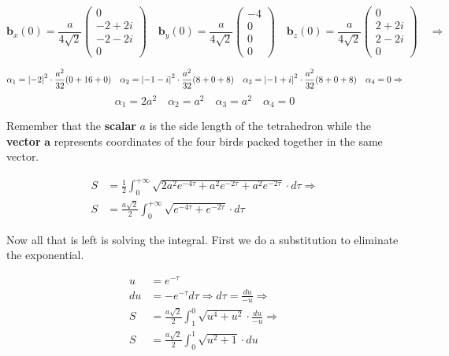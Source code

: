 \documentclass{article}
\newcommand{\vect}[1]{\mathbf{#1}}
\begin{document}
\[\vect b_x(0) = \frac{a}{4\sqrt{2}}\begin{pmatrix}
    0\\
    -2+2i\\
    -2-2i\\
    0
\end{pmatrix}\quad
\vect b_y(0) = \frac{a}{4\sqrt{2}}\begin{pmatrix}
    -4\\
    0\\
    0\\
    0
\end{pmatrix}\quad
\vect b_z(0) = \frac{a}{4\sqrt{2}}\begin{pmatrix}
    0\\
    2+2i\\
    2-2i\\
    0
\end{pmatrix} \quad \Rightarrow\]

\[\alpha_1 = \abs{-2}^2\cdot\frac{a^2}{32}(0+16+0) \quad \alpha_2 = \abs{-1-i}^2\cdot\frac{a^2}{32}(8+0+8) \quad \alpha_3 = \abs{-1+i}^2\cdot\frac{a^2}{32}(8+0+8) \quad \alpha_4 = 0 \Rightarrow\]
\[\boxed{\alpha_1 = 2a^2 \quad \alpha_2 = a^2 \quad \alpha_3 = a^2 \quad \alpha_4 = 0}\]

Remember that the \textbf{scalar} $a$ is the side length of the tetrahedron while the \textbf{vector} $\vect{a}$ represents coordinates of the four birds packed together in the same vector.

\begin{align*}
S &= \frac{1}{2}\int_0^{+\infty}\sqrt{2a^2 e^{-4\tau} + a^2 e^{-2\tau} + a^2 e^{-2\tau}}\cdot d\tau \Rightarrow \\
S &= \frac{a\sqrt{2}}{2}\int_0^{+\infty}\sqrt{e^{-4\tau} + e^{-2\tau}}\cdot d\tau
\end{align*}

Now all that is left is solving the integral. First we do a substitution to eliminate the exponential.

\begin{align*}
u &= e^{-\tau} \\
du &= -e^{-\tau}d\tau \Rightarrow d\tau = \frac{du}{-u} \Rightarrow \\
S &= \frac{a\sqrt{2}}{2}\int_1^{0}\sqrt{u^4 + u^2}\cdot \frac{du}{-u} \Rightarrow \\
S &= \frac{a\sqrt{2}}{2}\int_0^{1}\sqrt{u^2 + 1}\cdot du \\
\end{align*}
\end{document}
